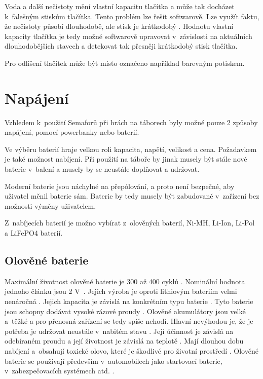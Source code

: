 Voda a další nečistoty mění vlastní kapacitu tlačítka a může tak docházet k~falešným stiskům tlačítka. Tento problém lze řešit softwarově. 
Lze využít faktu, že nečistoty působí dlouhodobě, ale stisk je krátkodobý \cite{PrincipKapTl}. Hodnotu vlastní kapacity tlačítka je tedy
možné softwarově upravovat v~závislosti na aktuálních dlouhodobějších stavech a detekovat tak přesněji krátkodobý stisk tlačítka.

Pro odlišení tlačítek může být místo označeno například barevným potiskem. 

\section{Napájení}
Vzhledem k~použití Semaforů při hrách na táborech byly možné pouze 2 způsoby napájení, pomocí powerbanky nebo baterií. 

Ve výběru baterií hraje velkou roli kapacita, napětí, velikost a cena. Požadavkem je také možnost nabíjení. Při použití na táboře by jinak musely být stále 
nové baterie v~balení a musely by se neustále doplňovat a udržovat.

Moderní baterie jsou náchylné na přepólování, a proto není bezpečné, aby uživatel měnil baterie sám. Baterie by tedy musely být zabudované v~zařízení 
bez možnosti výměny uživatelem. 


Z~nabíjecích baterií je možno vybírat z~olověných baterií, Ni-MH, Li-Ion, Li-Pol a LiFePO4 baterií.

\subsection{Olověné baterie}
Maximální životnost olověné baterie je 300 až 400 cyklů \cite{LiFePO4_malina}. Nominální hodnota jednoho článku jsou 2 V~\cite{olovene}. Jejich výroba je oproti
lithiovým bateriím velmi nenáročná \cite{olovene}. Jejich kapacita je závislá na konkrétním typu baterie \cite{olovene}. Tyto baterie jsou schopny dodávat vysoké
rázové proudy \cite{akumulatory}. Olověné akumulátory jsou velké a~těžké a pro přenosná zařízení se tedy spíše nehodí. Hlavní nevýhodou je, že je potřeba je udržovat 
neustále v~nabitém stavu \cite{olovene}. Její účinnost je závislá na odebíraném proudu a její životnost je závislá na teplotě \cite{olovene}. Mají dlouhou dobu 
nabíjení a~obsahují toxické olovo, které je škodlivé pro životní prostředí \cite{olovene}. Olověné baterie se používají především v~automobilech jako startovací 
baterie, v~zabezpečovacích systémech atd. \cite{olovene}.

